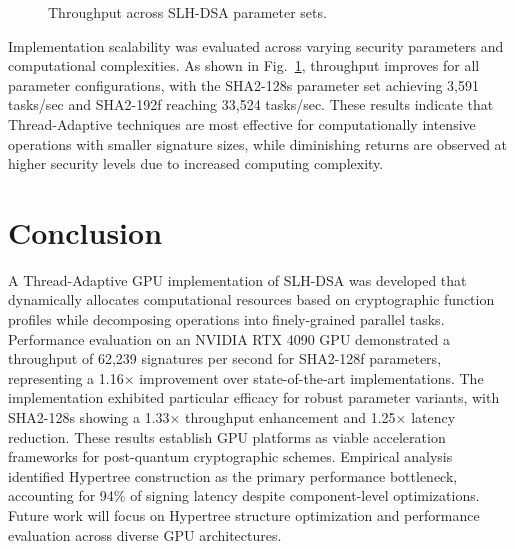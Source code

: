\documentclass[journal]{IEEEtran}
\begin{document}
\begin{figure}[h]
  \centering
  \caption{Throughput across SLH-DSA parameter sets.}
  \label{fig:scalability_line}
\end{figure}

Implementation scalability was evaluated across varying security parameters and computational complexities. As shown in Fig.~\ref{fig:scalability_line}, throughput improves for all parameter configurations, with the SHA2-128s parameter set achieving 3,591 tasks/sec and SHA2-192f reaching 33,524 tasks/sec. These results indicate that Thread-Adaptive techniques are most effective for computationally intensive operations with smaller signature sizes, while diminishing returns are observed at higher security levels due to increased computing complexity.

\section{Conclusion}\label{sec:conclusion}

A Thread-Adaptive GPU implementation of SLH-DSA was developed that dynamically allocates computational resources based on cryptographic function profiles while decomposing operations into finely-grained parallel tasks.
Performance evaluation on an NVIDIA RTX 4090 GPU demonstrated a throughput of 62,239 signatures per second for SHA2-128f parameters, representing a 1.16$\times$ improvement over state-of-the-art implementations. The implementation exhibited particular efficacy for robust parameter variants, with SHA2-128s showing a 1.33$\times$ throughput enhancement and 1.25$\times$ latency reduction. These results establish GPU platforms as viable acceleration frameworks for post-quantum cryptographic schemes.
Empirical analysis identified Hypertree construction as the primary performance bottleneck, accounting for 94\% of signing latency despite component-level optimizations. Future work will focus on Hypertree structure optimization and performance evaluation across diverse GPU architectures.
\end{document}
